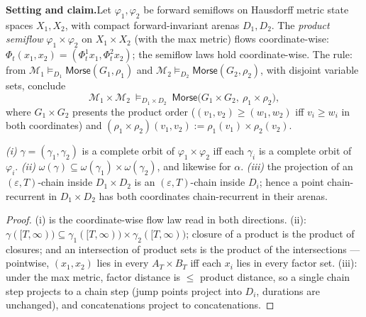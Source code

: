 

\textbf{Setting and claim.}\enspace Let $\varphi_1, \varphi_2$ be
forward semiflows on Hausdorff metric state spaces $X_1, X_2$, with
compact forward-invariant arenas $D_1, D_2$. The \emph{product
semiflow} $\varphi_1 \times \varphi_2$ on $X_1 \times X_2$ (with the
max metric) flows coordinate-wise:
$\Phi_t(x_1, x_2) = (\Phi^1_t x_1, \Phi^2_t x_2)$; the semiflow laws
hold coordinate-wise. The rule: from
$\mathcal{M}_1 \vDash_{D_1} \mathsf{Morse}(G_1, \rho_1)$ and
$\mathcal{M}_2 \vDash_{D_2} \mathsf{Morse}(G_2, \rho_2)$, with
disjoint variable sets, conclude
\[
\mathcal{M}_1 \times \mathcal{M}_2 \ \vDash_{D_1 \times D_2}\
\mathsf{Morse}\big(G_1 \times G_2,\ \rho_1 \times \rho_2\big),
\]
where $G_1 \times G_2$ presents the product order
($(v_1, v_2) \geq (w_1, w_2)$ iff $v_i \geq w_i$ in both coordinates)
and $(\rho_1 \times \rho_2)(v_1, v_2) := \rho_1(v_1) \times
\rho_2(v_2)$.

\begin{blemma}
\label{lem:qmp-factor}
\emph{(i)} $\gamma = (\gamma_1, \gamma_2)$ is a complete orbit of
$\varphi_1 \times \varphi_2$ iff each $\gamma_i$ is a complete orbit
of $\varphi_i$.
\emph{(ii)} $\omega(\gamma) \subseteq \omega(\gamma_1) \times
\omega(\gamma_2)$, and likewise for $\alpha$.
\emph{(iii)} the projection of an $(\varepsilon, T)$-chain inside
$D_1 \times D_2$ is an $(\varepsilon, T)$-chain inside $D_i$; hence a
point chain-recurrent in $D_1 \times D_2$ has both coordinates
chain-recurrent in their arenas.
\end{blemma}
\begin{proof}
(i) is the coordinate-wise flow law read in both directions. (ii):
$\gamma([T, \infty)) \subseteq \gamma_1([T,\infty)) \times
\gamma_2([T,\infty))$; closure of a product is the product of
closures; and an intersection of product sets is the product of the
intersections --- pointwise, $(x_1, x_2)$ lies in every
$A_T \times B_T$ iff each $x_i$ lies in every factor set. (iii): under
the max metric, factor distance is $\leq$ product distance, so a
single chain step projects to a chain step (jump points project into
$D_i$, durations are unchanged), and concatenations project to
concatenations.
\end{proof}

